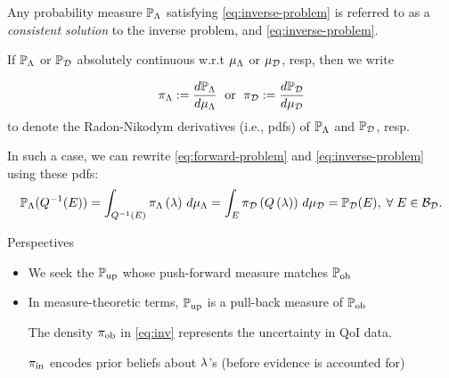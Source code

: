 \begin{frame}[t]

\begin{defn}\label{defn:consistent-solution}
  \noindent Any probability measure $\mathbb{P}_{\Lambda}$ satisfying \eqref{eq:inverse-problem} is referred to as a \emph{consistent solution} to the inverse problem, and \eqref{eq:inverse-problem}.

  If $\mathbb{P}_{\Lambda}$ or $\mathbb{P}_{\mathcal{D}}$ absolutely continuous w.r.t $\mu_{{\Lambda}}$ or $\mu_{\mathcal{D}}$, resp, then we write

  \begin{equation*}
    \pi_{\Lambda} := \frac{d\mathbb{P}_{\Lambda}}{d\mu_{{\Lambda}}} \;\text{ or }\; \pi_{\mathcal{D}} := \frac{d\mathbb{P}_{\mathcal{D}}}{d\mu_{\mathcal{D}}}
  \end{equation*}
  to denote the Radon-Nikodym derivatives (i.e., pdfs) of $\mathbb{P}_{\Lambda}$ and $\mathbb{P}_{\mathcal{D}}$, resp.

  In such a case, we can rewrite \eqref{eq:forward-problem} and \eqref{eq:inverse-problem} using these pdfs:
  \begin{equation*}
  \mathbb{P}_{\Lambda} (Q^{-1}(E)) = \int_{Q^{-1}(E)} \pi_{\Lambda} \left ( \lambda \right ) \, d\mu_{{\Lambda}} = \int_E \pi_{\mathcal{D}} \left ( Q\left ( \lambda \right ) \right ) \, d\mu_{\mathcal{D}} = \mathbb{P}_{\mathcal{D}}(E), \; \forall \; E \in \mathcal{B}_{\mathcal{D}}.
  \end{equation*}

\end{defn}

\end{frame}

\begin{frame}[t]{Perspectives}
\begin{itemize}
	\item We seek the $\operatorname*{\mathbb{P}_{up}}$ whose push-forward measure matches $\operatorname*{\mathbb{P}_{ob}}$
	\item In measure-theoretic terms, $\operatorname*{\mathbb{P}_{up}}$ is a pull-back measure of $\operatorname*{\mathbb{P}_{ob}}$

	\begin{defn}\label{defn:obsden}
		The density $\operatorname*{\pi_{ob}}$ in \eqref{eq:inv} represents the uncertainty in QoI data.
	\end{defn}

	\begin{defn}\label{defn:initialden}
		$\operatorname*{\pi_{in}}$ encodes prior beliefs about $\lambda$'s (before evidence is accounted for)
	\end{defn}

\end{itemize}

\end{frame}

